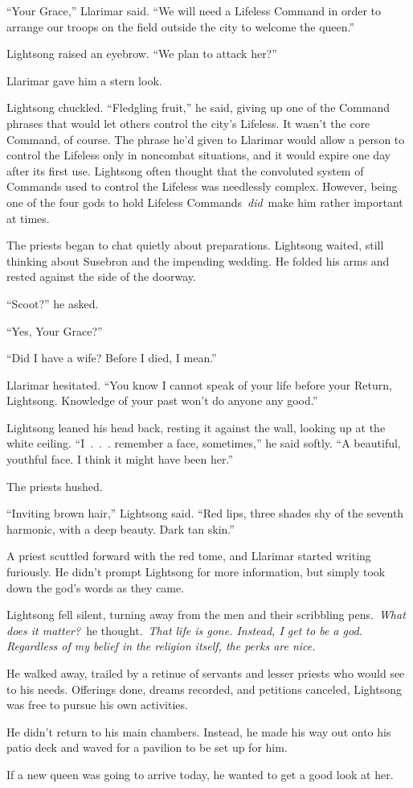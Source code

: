 “Your Grace,” Llarimar said. “We will need a Lifeless Command in order to arrange our troops on the field outside the city to welcome the queen.”

Lightsong raised an eyebrow. “We plan to attack her?”

Llarimar gave him a stern look.

Lightsong chuckled. “Fledgling fruit,” he said, giving up one of the Command phrases that would let others control the city’s Lifeless. It wasn’t the core Command, of course. The phrase he’d given to Llarimar would allow a person to control the Lifeless only in noncombat situations, and it would expire one day after its first use. Lightsong often thought that the convoluted system of Commands used to control the Lifeless was needlessly complex. However, being one of the four gods to hold Lifeless Commands~\textit{did}~make him rather important at times.

The priests began to chat quietly about preparations. Lightsong waited, still thinking about Susebron and the impending wedding. He folded his arms and rested against the side of the doorway.

“Scoot?” he asked.

“Yes, Your Grace?”

“Did I have a wife? Before I died, I mean.”

Llarimar hesitated. “You know I cannot speak of your life before your Return, Lightsong. Knowledge of your past won’t do anyone any good.”

Lightsong leaned his head back, resting it against the wall, looking up at the white ceiling. “I~.~.~. remember a face, sometimes,” he said softly. “A beautiful, youthful face. I think it might have been her.”

The priests hushed.

“Inviting brown hair,” Lightsong said. “Red lips, three shades shy of the seventh harmonic, with a deep beauty. Dark tan skin.”

A priest scuttled forward with the red tome, and Llarimar started writing furiously. He didn’t prompt Lightsong for more information, but simply took down the god’s words as they came.

Lightsong fell silent, turning away from the men and their scribbling pens.~\textit{What does it matter?}~he thought.~\textit{That life is gone. Instead, I get to be a god. Regardless of my belief in the religion itself, the perks are nice.}

He walked away, trailed by a retinue of servants and lesser priests who would see to his needs. Offerings done, dreams recorded, and petitions canceled, Lightsong was free to pursue his own activities.

He didn’t return to his main chambers. Instead, he made his way out onto his patio deck and waved for a pavilion to be set up for him.

If a new queen was going to arrive today, he wanted to get a good look at her.

